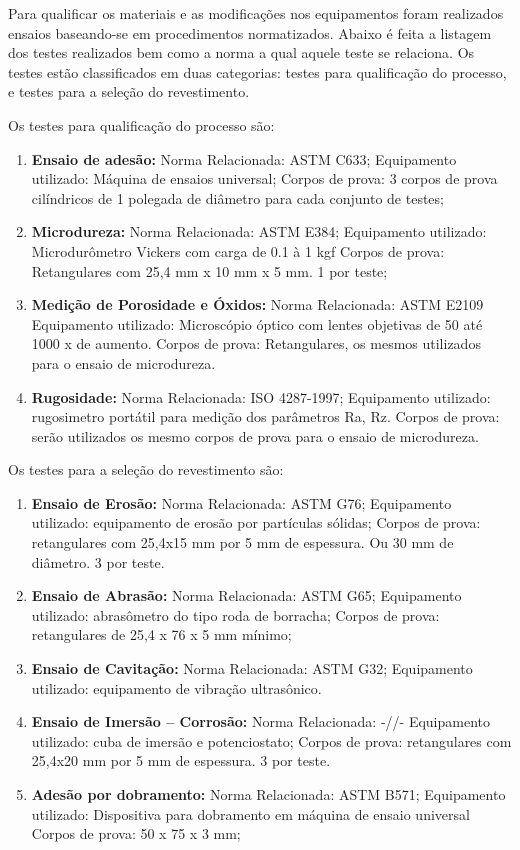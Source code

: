 Para qualificar os materiais e as modificações nos equipamentos foram
realizados ensaios baseando-se em procedimentos normatizados. Abaixo é feita a
listagem dos testes realizados bem como a norma a qual aquele teste se
relaciona. Os testes estão classificados em duas categorias: testes para
qualificação do processo, e testes para a seleção do revestimento.

Os testes para qualificação do processo são:

\begin{enumerate}
  \item \textbf{Ensaio de adesão:} Norma Relacionada: ASTM C633; Equipamento
  utilizado: Máquina de ensaios universal; Corpos de prova: 3 corpos de prova
  cilíndricos de 1 polegada de diâmetro para cada conjunto de testes;
  \item \textbf{Microdureza:} Norma Relacionada: ASTM E384; Equipamento
  utilizado: Microdurômetro Vickers com carga de 0.1 à 1 kgf Corpos de prova:
  Retangulares com 25,4 mm x 10 mm x 5 mm. 1 por teste;
  \item \textbf{Medição de Porosidade e Óxidos:} Norma Relacionada: ASTM E2109
  Equipamento utilizado: Microscópio óptico com lentes objetivas de 50 até 1000
 x de aumento. Corpos de prova: Retangulares, os mesmos utilizados para o ensaio
 de microdureza.
  \item \textbf{Rugosidade:} Norma Relacionada: ISO 4287-1997; Equipamento
  utilizado: rugosimetro portátil para medição dos parâmetros Ra, Rz.
  Corpos de prova: serão utilizados os mesmo corpos de prova para o ensaio de
  microdureza.
\end{enumerate}

Os testes para a seleção do revestimento são:
\begin{enumerate}
  \item \textbf{Ensaio de Erosão:} Norma Relacionada: ASTM G76;
  Equipamento utilizado: equipamento de erosão por partículas sólidas;
  Corpos de prova: retangulares com 25,4x15 mm por 5 mm de espessura. Ou 30 mm
   de diâmetro. 3 por teste.
  \item \textbf{Ensaio de Abrasão:} Norma Relacionada: ASTM G65;
  Equipamento utilizado: abrasômetro do tipo roda de borracha;
  Corpos de prova: retangulares de 25,4 x 76 x 5 mm mínimo;
   \item \textbf{Ensaio de Cavitação:} Norma Relacionada: ASTM G32;
    Equipamento utilizado: equipamento de vibração ultrasônico.
   \item \textbf{Ensaio de Imersão – Corrosão:} Norma Relacionada: -//-
   Equipamento utilizado: cuba de imersão e potenciostato;
  Corpos de prova: retangulares com 25,4x20 mm por 5 mm de espessura. 3 por
  teste.
   \item \textbf{Adesão por dobramento:} Norma Relacionada: ASTM B571;
Equipamento utilizado: Dispositiva para dobramento em máquina de ensaio universal
Corpos de prova: 50 x 75 x 3 mm;
\end{enumerate}

